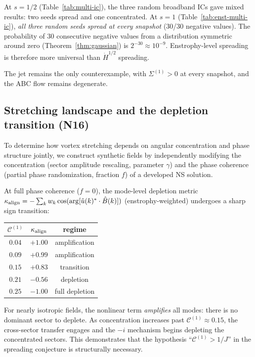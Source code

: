 \documentclass[11pt]{article}
\theoremstyle{definition}
\newcommand{\Hdot}[1]{\dot{H}^{#1}}
\newcommand{\cC}{\mathcal{C}}
\begin{document}
At $s=1/2$ (Table~\ref{tab:multi-ic}), the three
random broadband ICs gave mixed results: two seeds
spread and one concentrated.  At $s=1$
(Table~\ref{tab:enst-multi-ic}), \emph{all three
random seeds spread at every snapshot} (30/30 negative
values).  The probability of 30 consecutive negative
values from a distribution symmetric around zero
(Theorem~\ref{thm:gaussian}) is
$2^{-30}\approx 10^{-9}$.  Enstrophy-level spreading
is therefore more universal than $\Hdot{1/2}$ spreading.

The jet remains the only counterexample, with
$\Sigma^{(1)}>0$ at every snapshot, and the ABC flow
remains degenerate.


\subsection{Stretching landscape and the depletion
transition (N16)}
\label{sec:Phi-landscape}

To determine how vortex stretching depends on
angular concentration and phase structure jointly,
we construct synthetic fields by independently
modifying the concentration (sector amplitude
rescaling, parameter $\gamma$) and the phase
coherence (partial phase randomization, fraction $f$)
of a developed NS solution.

At full phase coherence ($f=0$), the mode-level
depletion metric
$\kappa_{\rm align} = -\sum_k w_k
\cos(\arg[\hat u(k)^*\cdot\hat B(k)])$
(enstrophy-weighted) undergoes a sharp sign
transition:
\begin{center}
\begin{tabular}{@{}ccc@{}}
\toprule
$\cC^{(1)}$ & $\kappa_{\rm align}$ & regime \\
\midrule
$0.04$ & $+1.00$ & amplification \\
$0.09$ & $+0.99$ & amplification \\
$0.15$ & $+0.83$ & transition \\
$0.21$ & $-0.56$ & depletion \\
$0.25$ & $-1.00$ & full depletion \\
\bottomrule
\end{tabular}
\end{center}

For nearly isotropic fields, the nonlinear term
\emph{amplifies} all modes: there is no dominant
sector to deplete.  As concentration increases past
$\cC^{(1)}\approx 0.15$, the cross-sector transfer
engages and the $-i$ mechanism begins depleting the
concentrated sectors.  This demonstrates that the
hypothesis ``$\cC^{(1)}>1/J$'' in the spreading
conjecture is structurally necessary.
\end{document}
